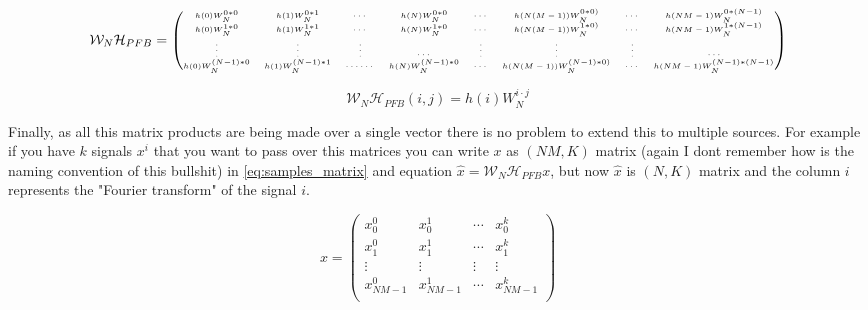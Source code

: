 \begin{equation}
    \label{eq:filter_dft}
    \mathcal{W}_N\mathcal{H}_{PFB} = 
    \tiny{
    \begin{pmatrix}
        h(0)W_{N}^{0*0} & h(1)W_{N}^{0*1} & \cdots & h(N)W_{N}^{0*0} &\cdots &h(N(M-1))W_{N}^{0*0)} &\cdots &h(NM-1)W_N^{0*(N-1)}\\
        h(0)W_{N}^{1*0} & h(1)W_{N}^{1*1} & \cdots & h(N)W_{N}^{1*0} &\cdots &h(N(M-1))W_{N}^{1*0)} &\cdots &h(NM-1)W_N^{1*(N-1)}\\
        \vdots          & \vdots          & \vdots & \cdots               &\vdots & \vdots               &\vdots &\cdots              \\ 
        h(0)W_{N}^{(N-1)*0} & h(1)W_{N}^{(N-1)*1} & \cdots \cdots &h(N)W_{N}^{(N-1)*0} &\cdots &h(N(M-1))W_{N}^{(N-1)*0)} &\cdots &h(NM-1)W_N^{(N-1)*(N-1)}\\
    \end{pmatrix}
}
\end{equation}

\begin{equation}
    \label{eq:filter_dft_elements}
    \mathcal{W}_N\mathcal{H}_{PFB} (i,j) = h(i)W_{N}^{i \cdot j}
\end{equation}

Finally, as all this matrix products are being made over a single vector there is no problem to extend this to multiple sources. For example if you have $k$ signals $x^{i}$ that you want to pass over this matrices you can write $x$ as $(NM, K)$ matrix (again I dont remember how is the naming convention of this bullshit) in \ref{eq:samples_matrix} and equation $\hat{x} = \mathcal{W}_N \mathcal{H}_{PFB}x$, but now $\hat{x}$ is $(N,K)$ matrix and the column $i$ represents the "Fourier transform" of the signal $i$.


\begin{equation}
    \label{eq:samples_matrix}
    x = 
    \begin{pmatrix}
        x_0^{0} & x_0^1  & \cdots & x_0^{k} \\
        x_1^{0} & x_1^1  & \cdots & x_1^{k} \\
        \vdots  & \vdots & \vdots & \vdots  \\
        x^0_{NM-1} & x_{NM-1}^1  & \cdots & x_{NM-1}^{k} \\
    \end{pmatrix}
\end{equation}




